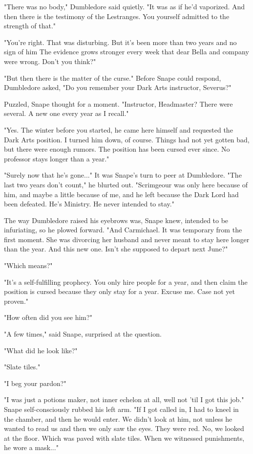 \documentclass[a4paper,11pt]{article}
\begin{document}
"There was no body," Dumbledore said quietly. "It was as if he'd vaporized. And then there is the testimony of the Lestranges. You yourself admitted to the strength of that."

"You're right. That was disturbing. But it's been more than two years and no sign of him The evidence grows stronger every week that dear Bella and company were wrong. Don't you think?"

"But then there is the matter of the curse." Before Snape could respond, Dumbledore asked, "Do you remember your Dark Arts instructor, Severus?"

Puzzled, Snape thought for a moment. "Instructor, Headmaster? There were several. A new one every year as I recall."

"Yes. The winter before you started, he came here himself and requested the Dark Arts position. I turned him down, of course. Things had not yet gotten bad, but there were enough rumors. The position has been cursed ever since. No professor stays longer than a year."

"Surely now that he's gone..." It was Snape's turn to peer at Dumbledore. "The last two years don't count," he blurted out. "Scrimgeour was only here because of him, and maybe a little because of me, and he left because the Dark Lord had been defeated. He's Ministry. He never intended to stay."

The way Dumbledore raised his eyebrows was, Snape knew, intended to be infuriating, so he plowed forward. "And Carmichael. It was temporary from the first moment. She was divorcing her husband and never meant to stay here longer than the year. And this new one. Isn't she supposed to depart next June?"

"Which means?"

"It's a self-fulfilling prophecy. You only hire people for a year, and then claim the position is cursed because they only stay for a year. Excuse me. Case not yet proven."

"How often did you see him?"

"A few times," said Snape, surprised at the question.

"What did he look like?"

"Slate tiles."

"I beg your pardon?"

"I was just a potions maker, not inner echelon at all, well not 'til I got this job." Snape self-consciously rubbed his left arm. "If I got called in, I had to kneel in the chamber, and then he would enter. We didn't look at him, not unless he wanted to read us and then we only saw the eyes. They were red. No, we looked at the floor. Which was paved with slate tiles. When we witnessed punishments, he wore a mask..."
\end{document}
